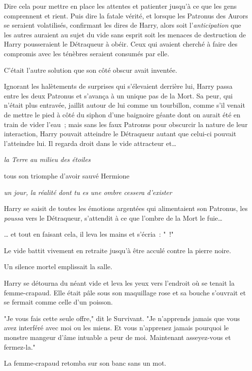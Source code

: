 Dire cela pour mettre en place les attentes et patienter jusqu'à ce que les gens comprennent et rient. Puis dire la fatale vérité, et lorsque les Patronus des Aurors se seraient volatilisés, confirmant les dires de Harry, alors soit l'\emph{anticipation} que les autres auraient au sujet du vide sans esprit soit les menaces de destruction de Harry pousseraient le Détraqueur à obéir. Ceux qui avaient cherché à faire des compromis avec les ténèbres seraient consumés par elle.

C'était l'autre solution que son côté obscur avait inventée.

Ignorant les halètements de surprises qui s'élevaient derrière lui, Harry passa entre les deux Patronus et s'avança à un unique pas de la Mort. Sa peur, qui n'était plus entravée, jaillit autour de lui comme un tourbillon, comme s'il venait de mettre le pied à côté du siphon d'une baignoire géante dont on aurait été en train de vider l'eau~; mais sans les faux Patronus pour obscurcir la nature de leur interaction, Harry pouvait atteindre le Détraqueur autant que celui-ci pouvait l'atteindre lui. Il regarda droit dans le vide attracteur et…

\emph{la Terre au milieu des étoiles}

tous son triomphe d'avoir sauvé Hermione

\emph{un jour, la réalité dont tu es une ombre cessera d'exister}

Harry se saisit de toutes les émotions argentées qui alimentaient son Patronus, les \emph{poussa} vers le Détraqueur, s'attendit à ce que l'ombre de la Mort le fuie…

… et tout en faisant cela, il leva les mains et s'écria~: "~!"

Le vide battit vivement en retraite jusqu'à être acculé contre la pierre noire.

Un silence mortel emplissait la salle.

Harry se détourna du néant vide et leva les yeux vers l'endroit où se tenait la femme-crapaud. Elle était pâle sous son maquillage rose et sa bouche s'ouvrait et se fermait comme celle d'un poisson.

"Je vous fais cette seule offre," dit le Survivant. "Je n'apprends jamais que vous avez interféré avec moi ou les miens. Et vous n'apprenez jamais pourquoi le monstre mangeur d'âme intuable a peur de moi. Maintenant asseyez-vous et fermez-la."

La femme-crapaud retomba sur son banc sans un mot.

